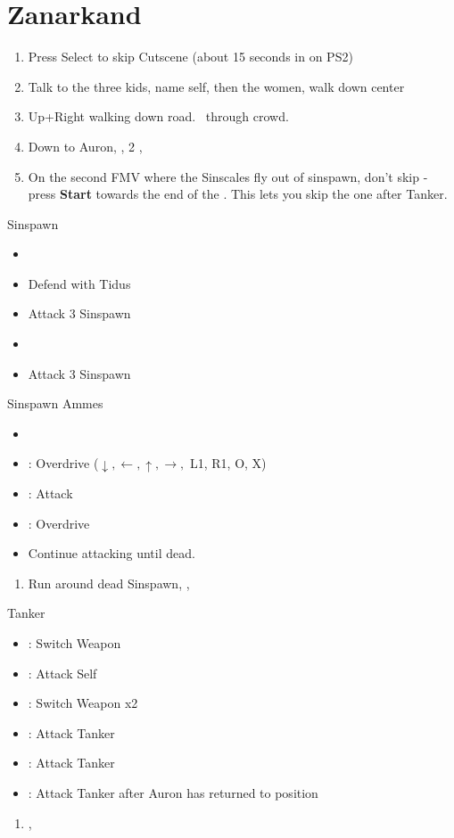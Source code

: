 \chapter{Zanarkand}

\begin{enumerate}
  \item Press Select to skip Cutscene (about 15 seconds in on PS2)
  \item Talk to the three kids, name self, then the women, walk down center
  \item Up+Right walking down road. \sd \ through crowd. \skippablefmv[2:30]
  \item Down to Auron, \sd, 2 \skippablefmv[2:30], \sd
  \item On the second FMV where the Sinscales fly out of sinspawn, don't skip - press \textbf{Start} towards the end of the \fmv. This lets you skip the one after Tanker.
\end{enumerate}
\begin{battle}{Sinspawn}
  \begin{itemize}
    \item \sd
    \item Defend with Tidus
    \item Attack 3 Sinspawn
    \item \sd
    \item Attack 3 Sinspawn
  \end{itemize}
\end{battle}
\begin{battle}[2400]{Sinspawn Ammes}
  \begin{itemize}
    \item \sd
    \item \auron: Overdrive ($\downarrow, \leftarrow, \uparrow, \rightarrow,$ L1, R1, O, X)
    \item \tidus: Attack
    \item \tidus: Overdrive
    \item Continue attacking until dead.
  \end{itemize}
\end{battle}
\begin{enumerate}[resume]
  \item Run around dead Sinspawn, \save, \sd
\end{enumerate}
\begin{battle}[1000]{Tanker}
  \begin{itemize}
    \item \tidus: Switch Weapon
    \item \auron: Attack Self
    \item \tidus: Switch Weapon x2
    \item \tidus: Attack Tanker
    \item \auron: Attack Tanker
    \item \tidus: Attack Tanker after Auron has returned to position
  \end{itemize}
\end{battle}
\begin{enumerate}[resume]
  \item \cs[2:00], \skippablefmv
\end{enumerate}